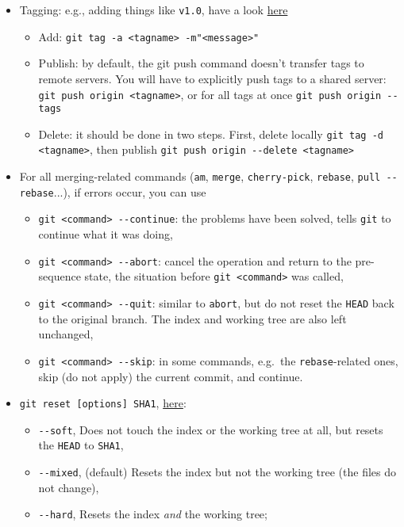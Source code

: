 \documentclass[a4paper,12pt,%
              final%
              ]{article}
\begin{document}
\begin{itemize}
\begin{itemize}
    \end{itemize}
  \item Tagging: e.g., adding things like \texttt{v1.0}, have a look \href{https://git-scm.com/book/en/v2/Git-Basics-Tagging}{here}
    \begin{itemize}
      \item Add: \verb|git tag -a <tagname> -m"<message>"|
      \item Publish: by default, the git push command doesn't transfer tags to remote servers. You will have to explicitly push tags to a shared server: \verb|git push origin <tagname>|, or for all tags at once \verb|git push origin --tags|
      \item Delete: it should be done in two steps. First, delete locally \verb|git tag -d <tagname>|, then publish \verb|git push origin --delete <tagname>|
    \end{itemize}
  \item For all merging-related commands (\texttt{am}, \texttt{merge}, \texttt{cherry-pick}, \texttt{rebase}, \verb|pull --rebase|...), if errors occur, you can use
    \begin{itemize}
      \item \verb|git <command> --continue|: the problems have been solved, tells \texttt{git} to continue what it was doing,
      \item \verb|git <command> --abort|: cancel the operation and return to the pre-sequence state, the situation before \texttt{git <command>} was called,
      \item \verb|git <command> --quit|: similar to \texttt{abort}, but do not reset the \texttt{HEAD} back to the original branch. The index and working tree are also left unchanged,
      \item \verb|git <command> --skip|: in some commands, e.g.\ the \texttt{rebase}-related ones, skip (do not apply) the current commit, and continue.
    \end{itemize}
  \item \verb|git reset [options] SHA1|, \href{https://git-scm.com/docs/git-reset}{here}:
    \begin{itemize}
      \item \verb|--soft|, Does not touch the index or the working tree at all, but resets the \texttt{HEAD} to \texttt{SHA1},
      \item \verb|--mixed|, (default) Resets the index but not the working tree (the files do not change),
      \item \verb|--hard|, Resets the index \emph{and} the working tree;

\end{itemize}
\end{itemize}
\end{document}
